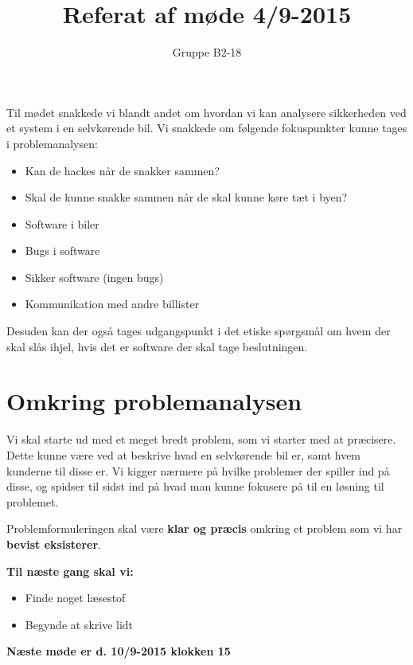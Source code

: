 \documentclass{article}
\begin{document}
	\title{Referat af møde 4/9-2015}
	\author{Gruppe B2-18}
	\maketitle
	Til mødet snakkede vi blandt andet om hvordan vi kan analysere sikkerheden ved et system i en selvkørende bil. Vi snakkede om følgende fokuspunkter kunne tages i problemanalysen:
	\begin{itemize}
		\item Kan de hackes når de snakker sammen?
		\item Skal de kunne snakke sammen når de skal kunne køre tæt i byen?
		\item Software i biler
		\item Bugs i software
		\item Sikker software (ingen bugs)
		\item Kommunikation med andre billister
	\end{itemize}
	Desuden kan der også tages udgangspunkt i det etiske spørgsmål om hvem der skal slås ihjel, hvis det er software der skal tage beslutningen.

	\section*{Omkring problemanalysen}
	Vi skal starte ud med et meget bredt problem, som vi starter med at præcisere. Dette kunne være ved at beskrive hvad en selvkørende bil er, samt hvem kunderne til disse er. Vi kigger nærmere på hvilke problemer der spiller ind på disse, og spidser til sidst ind på hvad man kunne fokusere på til en løsning til problemet.

	Problemformuleringen skal være \textbf{klar og præcis} omkring et problem som vi har \textbf{bevist eksisterer}.

	\noindent \textbf{Til næste gang skal vi:}
	\begin{itemize}
		\item Finde noget læsestof
		\item Begynde at skrive lidt
	\end{itemize}

	\noindent \textbf{Næste møde er d. 10/9-2015 klokken 15}
\end{document}
